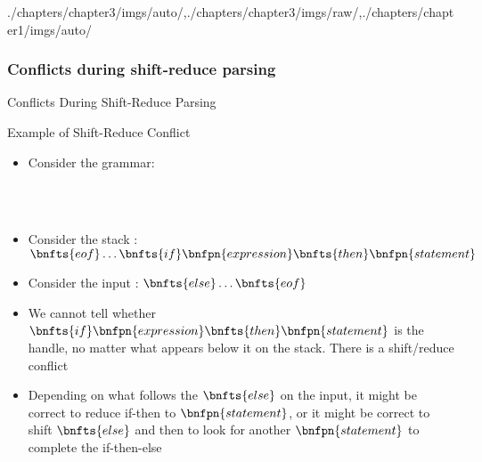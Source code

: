 \begin{graphicspathcontext}{{./chapters/chapter3/imgs/auto/},{./chapters/chapter3/imgs/raw/},{./chapters/chapter1/imgs/auto/}}
\begin{bibunit}[apalike]
\subsubsection{Conflicts during shift-reduce parsing}
\subsubsectiontableofcontentslide

\begin{frame}{Conflicts During Shift-Reduce Parsing}
	\vspace{.25cm}
	\begin{center}
		\hspace{.5cm}
	\end{center}
	\vspace{.25cm}
\end{frame}

\begin{frame}[background=9]{Example of Shift-Reduce Conflict}	
	\begin{itemize}
	\item Consider the grammar:
		\begin{footnotesize}\begin{bnf}
			 \\
			 \\
		\end{bnf}\end{footnotesize}
	\item Consider the stack : $\bnfts{eof} \dots \bnfts{if} \bnfpn{expression} \bnfts{then} \bnfpn{statement}$
	\item Consider the input : $\bnfts{else} \dots \bnfts{eof}$
	\vfill
	\item We cannot tell whether $\bnfts{if} \bnfpn{expression} \bnfts{then} \bnfpn{statement}$ is the handle, no matter what appears below it on the stack. There is a shift/reduce conflict
	\item Depending on what follows the $\bnfts{else}$ on the input, it might be correct to reduce if-then to $\bnfpn{statement}$, or it might be correct to shift $\bnfts{else}$ and then to look for another $\bnfpn{statement}$ to complete the if-then-else
	\end{itemize}
\end{frame}


\end{bibunit}
\end{graphicspathcontext}
